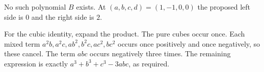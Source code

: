 No such polynomial $B$ exists. At $(a,b,c,d)=(1,-1,0,0)$ the proposed left side is $0$ and the right side is $2$.

For the cubic identity, expand the product. The pure cubes occur once. Each mixed term $a^2b,a^2c,ab^2,b^2c,ac^2,bc^2$ occurs once positively and once negatively, so these cancel. The term $abc$ occurs negatively three times. The remaining expression is exactly $a^3+b^3+c^3-3abc$, as required.
